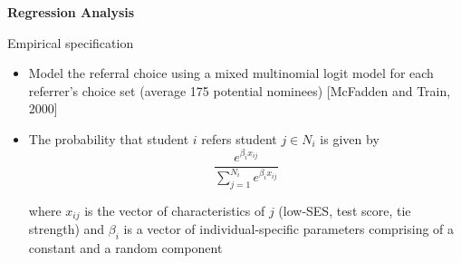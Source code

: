 \documentclass[aspectratio=169,xcolor=dvipsnames]{beamer}
\begin{document}
\begin{frame}[plain]
    \vspace{3em}
    \begin{center}
        \Huge\textbf{Regression Analysis}
    \end{center}
\end{frame}

\begin{frame}{Empirical specification}
    \begin{itemize}
        \item Model the referral choice using a mixed multinomial logit model for each referrer's choice set (average 175 potential nominees) [McFadden and Train, 2000]
        
        \item The probability that student $i$ refers student $j \in N_i$ is given by
        $$\frac{e^{\beta_i x_{ij}}}{\sum_{j=1}^{N_i} e^{\beta_i x_{ij}}}$$
        
        where $x_{ij}$ is the vector of characteristics of $j$ (low-SES, test score, tie strength) and $\beta_i$ is a vector of individual-specific parameters comprising
        of a constant and a random component
    \end{itemize}
\end{frame}
\end{document}
